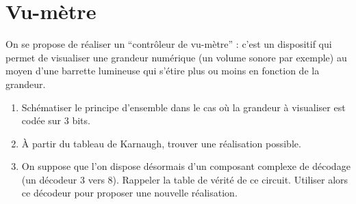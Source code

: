 \documentclass[a4paper,11pt]{article}
\begin{document}
\section{Vu-mètre}
On se propose de réaliser un ``contrôleur de vu-mètre'' : c'est un dispositif qui permet de visualiser une grandeur numérique (un volume sonore par exemple) au moyen d'une barrette lumineuse qui s'étire plus ou moins en fonction de la grandeur.

\begin{enumerate}
    \item Schématiser le principe d'ensemble dans le cas où la grandeur à visualiser est codée sur 3 bits.
    \item À partir du tableau de Karnaugh, trouver une réalisation possible.
    \item On suppose que l'on dispose désormais d'un composant complexe de décodage (un décodeur 3 vers 8). Rappeler la table de vérité de ce circuit. Utiliser alors ce décodeur pour proposer une nouvelle réalisation.
\end{enumerate}
\end{document}
